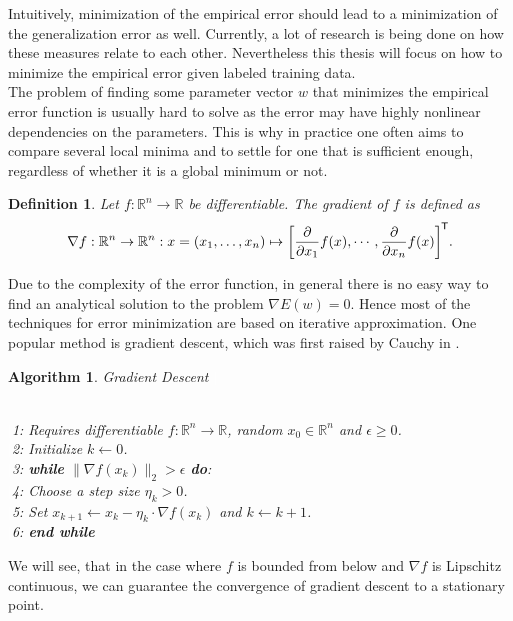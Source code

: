 \documentclass[11pt, a4paper]{article}
\newtheorem{definition}[theorem]{Definition}
\newtheorem{algorithm}[theorem]{Algorithm}
\newcommand{\R}{\mathbb{R}}
\newcommand*{\tr}{^{\mkern-1.5mu\mathsf{T}}}
\begin{document}
Intuitively, minimization of the empirical error should lead to a minimization of the generalization error as well. Currently, a lot of research is being done on how these measures relate to each other. Nevertheless this thesis will focus on how to minimize the empirical error given labeled training data. \\

The problem of finding some parameter vector $w$ that minimizes the empirical error function is usually hard to solve as the error may have highly nonlinear dependencies on the parameters. This is why in practice one often aims to compare several local minima and to settle for one that is sufficient enough, regardless of whether it is a global minimum or not.

\begin{definition}
Let $f: \R^n \to \R$ be differentiable. The gradient of $f$ is defined as
\[ \nabla f : \R^n \to \R^n : x = (x_1, \dots, x_n) \mapsto \bigg [ \frac{\partial}{\partial x_1} f(x), \cdots, \frac{\partial}{\partial x_n} f(x) \bigg ]\tr . \]
\end{definition}

Due to the complexity of the error function, in general there is no easy way to find an analytical solution to the problem $\nabla E(w) = 0$. Hence most of the techniques for error minimization are based on iterative approximation. One popular method is gradient descent, which was first raised by Cauchy in \cite{GD}.

\begin{algorithm}
\caption{Gradient Descent \textcolor{white}{$\Big |$}} \ \\
\textcolor{white}{$\Big |$}1: Requires differentiable $f: \R^n \to \R$, random $x_0 \in \R^n$ and $\epsilon \geq 0$. \\
\textcolor{white}{$\Big |$}2: Initialize $k \leftarrow 0$. \\
\textcolor{white}{$\Big |$}3: \textbf{while} $ \big \| \nabla f(x_k) \big \|_2 > \epsilon $ \textbf{do}:\\
\textcolor{white}{$\Big |$}4: \quad Choose a step size $\eta_k > 0$. \\
\textcolor{white}{$\Big |$}5: \quad Set $x_{k+1} \leftarrow x_k - \eta_k \cdot \nabla f(x_k)$ and $k \leftarrow k+1$. \\
\textcolor{white}{$\Big |$}6: \textbf{end while}
\end {algorithm}

We will see, that in the case where $f$ is bounded from below and $\nabla f$ is Lipschitz continuous, we can guarantee the  convergence of gradient descent to a stationary point.
\end{document}
